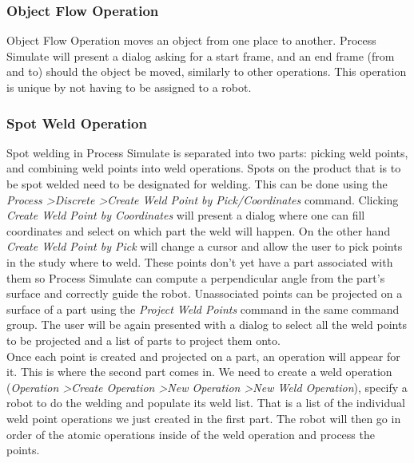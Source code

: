 \subsubsection{Object Flow Operation}
Object Flow Operation moves an object from one place to another.
Process Simulate will present a dialog asking for a start frame, and an end frame (from and to) should the object be moved, similarly to other operations.
This operation is unique by not having to be assigned to a robot. \\

\subsubsection{Spot Weld Operation}
Spot welding in Process Simulate is separated into two parts: picking weld points, and combining weld points into weld operations.
Spots on the product that is to be spot welded need to be designated for welding.
This can be done using the \emph{Process \textgreater Discrete \textgreater Create Weld Point by Pick/Coordinates} command.
Clicking \emph{Create Weld Point by Coordinates} will present a dialog where one can fill coordinates and select on which part the weld will happen.
On the other hand \emph{Create Weld Point by Pick} will change a cursor and allow the user to pick points in the study where to weld. 
These points don't yet have a part associated with them so Process Simulate can compute a perpendicular angle from the part's surface and correctly guide the robot.
Unassociated points can be projected on a surface of a part using the \emph{Project Weld Points} command in the same command group. 
The user will be again presented with a dialog to select all the weld points to be projected and a list of parts to project them onto. \\

Once each point is created and projected on a part, an operation will appear for it.
This is where the second part comes in.
We need to create a weld operation (\emph{Operation \textgreater Create Operation \textgreater New Operation \textgreater New Weld Operation}), specify a robot to do the welding and populate its weld list.
That is a list of the individual weld point operations we just created in the first part.
The robot will then go in order of the atomic operations inside of the weld operation and process the points. \\

